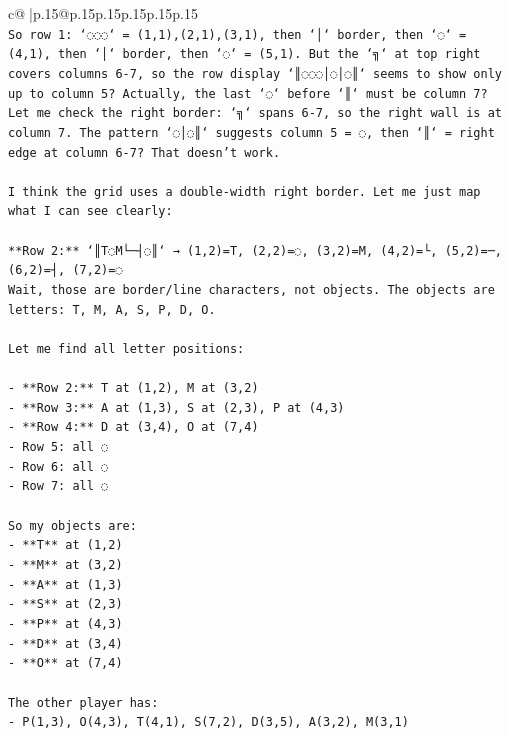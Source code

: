 \documentclass{article}
\begin{document}
{\begin{supertabular}{c@{$\;$}|p{.15\linewidth}@{}p{.15\linewidth}p{.15\linewidth}p{.15\linewidth}p{.15\linewidth}p{.15\linewidth}}
{{{\\ 
\texttt{So row 1: `◌◌◌` = (1,1),(2,1),(3,1), then `│` border, then `◌` = (4,1), then `│` border, then `◌` = (5,1). But the `╗` at top right covers columns 6{-}7, so the row display `║◌◌◌│◌│◌║` seems to show only up to column 5? Actually, the last `◌` before `║` must be column 7? Let me check the right border: `╗` spans 6{-}7, so the right wall is at column 7. The pattern `◌│◌║` suggests column 5 = ◌, then `║` = right edge at column 6{-}7? That doesn't work.} \\
\\ 
\texttt{I think the grid uses a double{-}width right border. Let me just map what I can see clearly:} \\
\\ 
\texttt{**Row 2:** `║T◌M└─┤◌║` → (1,2)=T, (2,2)=◌, (3,2)=M, (4,2)=└, (5,2)=─, (6,2)=┤, (7,2)=◌} \\
\texttt{Wait, those are border/line characters, not objects. The objects are letters: T, M, A, S, P, D, O.} \\
\\ 
\texttt{Let me find all letter positions:} \\
\\ 
\texttt{{-} **Row 2:** T at (1,2), M at (3,2)} \\
\texttt{{-} **Row 3:** A at (1,3), S at (2,3), P at (4,3)} \\
\texttt{{-} **Row 4:** D at (3,4), O at (7,4)} \\
\texttt{{-} Row 5: all ◌} \\
\texttt{{-} Row 6: all ◌  } \\
\texttt{{-} Row 7: all ◌} \\
\\ 
\texttt{So my objects are:} \\
\texttt{{-} **T** at (1,2)} \\
\texttt{{-} **M** at (3,2)} \\
\texttt{{-} **A** at (1,3)} \\
\texttt{{-} **S** at (2,3)} \\
\texttt{{-} **P** at (4,3)} \\
\texttt{{-} **D** at (3,4)} \\
\texttt{{-} **O** at (7,4)} \\
\\ 
\texttt{The other player has:} \\
\texttt{{-} P(1,3), O(4,3), T(4,1), S(7,2), D(3,5), A(3,2), M(3,1)} \\
\\ 
}}}
\end{supertabular}}
\end{document}
